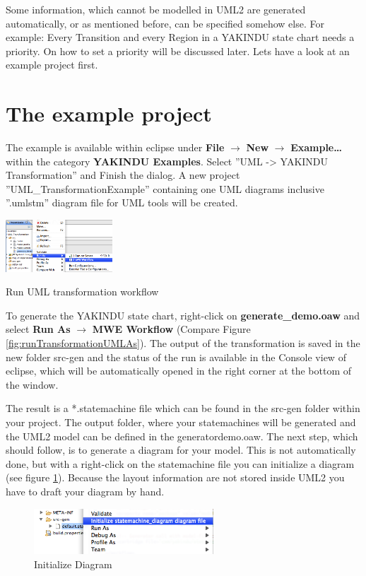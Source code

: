 Some information, which cannot be modelled in UML2 are generated
automatically, or as mentioned before, can be specified somehow else. For
example: Every Transition and every Region in a YAKINDU state chart needs a
priority. On how to set a priority will be discussed later. Lets have a look
at an example project first.

\section{The example project}
The example is available within eclipse under \textbf{File} $\rightarrow$
\textbf{New} $\rightarrow$ \textbf{Example\dots} within the category
\textbf{YAKINDU Examples}. Select ''UML -> YAKINDU Transformation'' and Finish the
dialog. A new project ''UML\_TransformationExample'' containing one UML
diagrams inclusive ''.umlstm'' diagram file for UML tools will be created.

\begin{floatingfigure}[r]{0.3\textwidth}
  \centering
\includegraphics[width=0.3\textwidth]{Pictures/runTransformationUMLAs}
\caption{\label{fig:runTransformationUMLAs}Run UML transformation workflow} 
\end{floatingfigure}
To generate the YAKINDU state chart, right-click on
\textbf{generate\_demo.oaw} and select \textbf{Run As} $\rightarrow$
\textbf{MWE Workflow} (Compare Figure \ref{fig:runTransformationUMLAs}). The
output of the transformation is saved in the new folder src-gen and the status
of the run is available in the Console view of eclipse, which will be
automatically opened in the right corner at the bottom of the window.

The result is a *.statemachine file which can be found in the src-gen folder
within your project. The output folder, where your statemachines will be generated
and the UML2 model can be defined in the generatordemo.oaw. The next step,
which should follow, is to generate a diagram for your model. This is not
automatically done, but with a right-click on the statemachine file you can
initialize a diagram (see figure \ref{fig:initializeDiagram}). Because the
layout information are not stored inside UML2 you have to draft your diagram
by hand. \begin{figure}[ht]
\center
\includegraphics[width=0.6\textwidth]{Pictures/initializeDiagram}
\caption{\label{fig:initializeDiagram}Initialize Diagram} 
\end{figure}

